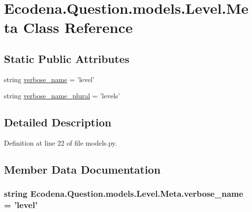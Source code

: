 \hypertarget{class_ecodena_1_1_question_1_1models_1_1_level_1_1_meta}{
\section{Ecodena.Question.models.Level.Meta Class Reference}
\label{dd/dc4/class_ecodena_1_1_question_1_1models_1_1_level_1_1_meta}
}
\subsection*{Static Public Attributes}
\begin{DoxyCompactItemize}
\item 
string \hyperlink{class_ecodena_1_1_question_1_1models_1_1_level_1_1_meta_a1fd3ff0fe1df95529bf7c74fe72fea51}{verbose\_\-name} = 'level'
\item 
string \hyperlink{class_ecodena_1_1_question_1_1models_1_1_level_1_1_meta_a0bcd87e70ea14c111af94c17deb2257e}{verbose\_\-name\_\-plural} = 'levels'
\end{DoxyCompactItemize}


\subsection{Detailed Description}


Definition at line 22 of file models.py.



\subsection{Member Data Documentation}
\hypertarget{class_ecodena_1_1_question_1_1models_1_1_level_1_1_meta_a1fd3ff0fe1df95529bf7c74fe72fea51}{
\subsubsection[{verbose\_\-name}]{\setlength{\rightskip}{0pt plus 5cm}string {\bf Ecodena.Question.models.Level.Meta.verbose\_\-name} = 'level'}}
\label{dd/dc4/class_ecodena_1_1_question_1_1models_1_1_level_1_1_meta_a1fd3ff0fe1df95529bf7c74fe72fea51}


